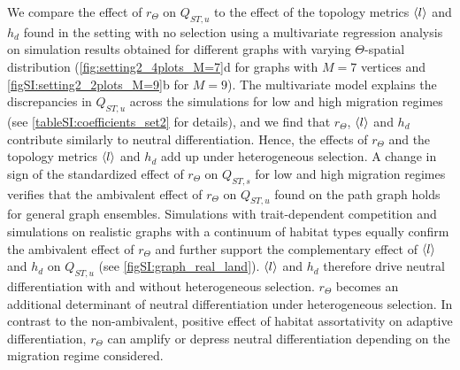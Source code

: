 We compare the effect of $r_\Theta$ on $Q_{ST,u}$ to the effect of the topology metrics $\langle l \rangle$ and $h_d$ found in the setting with no selection using a multivariate regression analysis on simulation results obtained for different graphs with varying $\Theta$-spatial distribution (\cref{fig:setting2_4plots_M=7}d for graphs with $M=7$ vertices and \cref{figSI:setting2_2plots_M=9}b for $M=9$).
%
The multivariate model explains the discrepancies in $Q_{ST,u}$ across the simulations for low and high migration regimes (see \cref{tableSI:coefficients_set2} for details), and we find that $r_\Theta$, $\langle l \rangle$ and $h_d$ contribute similarly to neutral differentiation.
%
Hence, the effects of $r_\Theta$ and the topology metrics $\langle l \rangle$ and $h_d$ add up under heterogeneous selection. A change in sign of the standardized effect of $r_\Theta$ on $Q_{ST,s}$ for low and high migration regimes verifies that the ambivalent effect of $r_\Theta$ on $Q_{ST,u}$ found on the path graph holds for general graph ensembles. 
%
Simulations with trait-dependent competition and simulations on realistic graphs with a continuum of habitat types equally confirm the ambivalent effect of $r_\Theta$ and further support the complementary effect of $\langle l \rangle$ and $h_d$ on $Q_{ST,u}$ (see \cref{figSI:graph_real_land}).
%
$\langle l \rangle$ and $h_d$ therefore drive neutral differentiation with and without heterogeneous selection. $r_\Theta$ becomes an additional determinant of neutral differentiation under heterogeneous selection. In contrast to the non-ambivalent, positive effect of habitat assortativity on adaptive differentiation, $r_\Theta$ can amplify or depress neutral differentiation depending on the migration regime considered.

